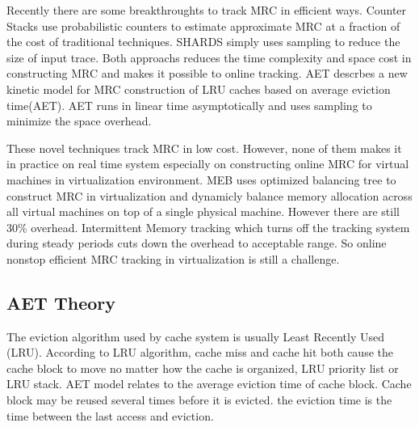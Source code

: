 \documentclass[10pt,twocolumn]{article}
\begin{document}
Recently there are some breakthroughts to track MRC in efficient ways. Counter Stacks\cite{Wires2014Characterizing} use probabilistic counters to estimate approximate MRC at a fraction of the cost of traditional techniques. SHARDS\cite{shards} simply uses sampling to reduce the size of input trace. Both approachs reduces the time complexity and space cost in constructing MRC and makes it possible to online tracking. AET\cite{aet} descrbes a new kinetic model for MRC construction of LRU caches based on average eviction time(AET). AET runs in linear time asymptotically and uses sampling to minimize the space overhead.

These novel techniques track MRC in low cost. However, none of them makes it in practice on real time system especially on constructing online MRC for virtual machines in virtualization environment. MEB\cite{Wang2016Dynamic} uses optimized balancing tree to construct MRC in virtualization and dynamicly balance memory allocation across all virtual machines on top of a single physical machine. However there are still 30\% overhead. Intermittent Memory tracking which turns off the tracking system during steady periods cuts down the overhead to acceptable range. So online nonstop efficient MRC tracking in virtualization is still a challenge.

\subsection{AET Theory}
The eviction algorithm used by cache system is usually Least Recently Used (LRU). According to LRU algorithm, cache miss and cache hit both cause the cache block to move no matter how the cache is organized, LRU priority list or LRU stack\cite{Jo2013Efficient}. AET model relates to the average eviction time of cache block. Cache block may be reused several times before it is evicted. the eviction time is the time between the last access and eviction.
\end{document}
